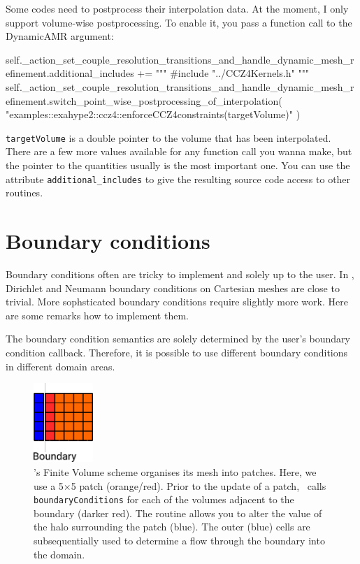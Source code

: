 \noindent
Some codes need to postprocess their interpolation data. At the moment, I only support volume-wise postprocessing.
To enable it, you pass a function call to the DynamicAMR argument: 
\begin{code}
        self._action_set_couple_resolution_transitions_and_handle_dynamic_mesh_refinement.additional_includes += """ 
#include "../CCZ4Kernels.h"
            """
self._action_set_couple_resolution_transitions_and_handle_dynamic_mesh_refinement.switch_point_wise_postprocessing_of_interpolation(
"examples::exahype2::ccz4::enforceCCZ4constraints(targetVolume)" )
\end{code}

\noindent
\texttt{targetVolume} is a double pointer to the volume that has been interpolated.
There are a few more values available for any function call you wanna make, but
the pointer to the quantities usually is the most important one.
You can use the attribute \texttt{additional\_includes} to give the resulting
source code access to other routines.



\section{Boundary conditions}

Boundary conditions often are tricky to implement and solely up to the user. 
In \ExaHyPE, Dirichlet and Neumann boundary conditions on Cartesian meshes are
close to trivial.
More sophsticated boundary conditions require slightly more work. 
Here are some remarks how to implement them.


\begin{remark}
  The boundary condition semantics are solely determined by the user's boundary
  condition callback.
  Therefore, it is possible to use different boundary conditions in different
  domain areas.
\end{remark}


\begin{figure}[htb]
 \begin{center}
  \includegraphics[width=0.2\textwidth]{60_exahype/boundary.pdf}
 \end{center}
 \caption{
  \ExaHyPE's Finite Volume scheme organises its mesh into patches. 
  Here, we use a 5$\times $5 patch (orange/red).
  Prior to the update of a patch, \ExaHyPE\ calls \texttt{boundaryConditions}
  for each of the volumes adjacent to the boundary (darker red).
  The routine allows you to alter the value of the halo surrounding the patch
  (blue).
  The outer (blue) cells are subsequentially used to determine a flow through
  the boundary into the domain.
  \label{figure:exahype:boundary-conditions}
 }
\end{figure}

